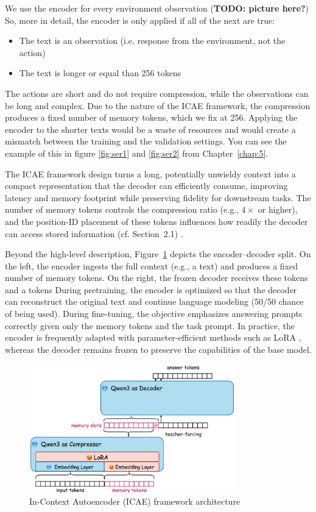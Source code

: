 We use the encoder for every environment observation (\textbf{TODO: picture here?})
So, more in detail, the encoder is only applied if all of the next are true:
\begin{itemize}
  \item The text is an observation (i.e. response from the environment, not the action)
  \item The text is longer or equal than 256 tokens
\end{itemize}
The actions are short and do not require compression, while the observations can be long and complex.
Due to the nature of the ICAE framework, the compression produces a fixed number of memory tokens, which we fix at 256.
Applying the encoder to the shorter texts would be a waste of resources and would create a mismatch between the training and the validation settings.
You can see the example of this in figure \ref{fig:ser1} and \ref{fig:ser2} from Chapter~\ref{chap:5}.

The ICAE framework design turns a long, potentially unwieldy context into a compact representation that the decoder can efficiently consume, improving latency and memory footprint while preserving fidelity for downstream tasks. 
The number of memory tokens controls the compression ratio (e.g., $4\times$ or higher), and the position-ID placement of these tokens influences how readily the decoder can access stored information (cf. Section~2.1) \cite{ge_-context_2024}.

Beyond the high-level description, Figure~\ref{fig:icae} depicts the encoder–decoder split. 
On the left, the encoder ingests the full context (e.g., a text) and produces a fixed number of memory tokens. 
On the right, the frozen decoder receives these tokens and a tokens
During pretraining, the encoder is optimized so that the decoder can reconstruct the original text and continue language modeling (50/50 chance of being used).
During fine-tuning, the objective emphasizes answering prompts correctly given only the memory tokens and the task prompt.
In practice, the encoder is frequently adapted with parameter-efficient methods such as LoRA \cite{hu2021lora}, whereas the decoder remains frozen to preserve the capabilities of the base model.
\begin{figure}[hbt]
  \centering
  \includegraphics[width=0.8\textwidth]{graphs/icae.jpeg}
  \caption{In-Context Autoencoder (ICAE) framework architecture}
  \label{fig:icae}
\end{figure}

